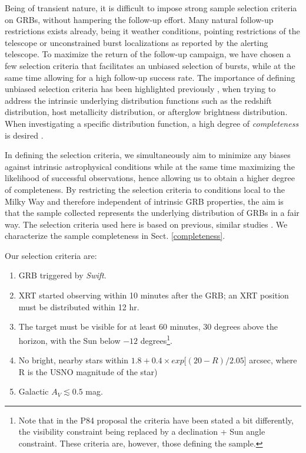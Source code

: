 \documentclass{aa}    %
\begin{document}
Being of transient nature, it is difficult to impose strong sample selection
criteria on GRBs, without hampering the follow-up effort. Many natural follow-up
restrictions exists already, being it weather conditions, pointing restrictions
of the telescope or unconstrained burst localizations as reported by the alerting
telescope. To maximize the return of the follow-up campaign, we have chosen a
few selection criteria that facilitates an unbiased selection of bursts, while
at the same time allowing for a high follow-up success rate. The importance of
defining unbiased selection criteria has been highlighted previously
\citep{Jakobsson2006b, Salvaterra2012, Hjorth2012, Vergani2015, Perley2016a},
when trying to address the intrinsic underlying distribution functions such as
the redshift distribution, host metallicity distribution, or afterglow
brightness distribution. When investigating a specific distribution function, a
high degree of \textit{completeness} is desired \citep[e.g.,][]{Perley2016b}.

In defining the selection criteria, we simultaneously aim to minimize any biases
against intrinsic astrophysical conditions while at the same time maximizing the
likelihood of successful observations, hence allowing us to obtain a higher
degree of completeness. By restricting the selection criteria to conditions
local to the Milky Way and therefore independent of intrinsic GRB properties,
the aim is that the sample collected represents the underlying distribution of
GRBs in a fair way. The selection criteria used here is based on previous,
similar studies \citep{Jakobsson2006b, Fynbo2009, Hjorth2012}. We characterize
the sample completeness in Sect. \ref{completeness}.

Our selection criteria are:

\begin{enumerate}
	\item GRB triggered by \textit{Swift}.
	\item XRT started observing within 10 minutes after the GRB; an XRT position must be distributed within 12 hr.
	\item The target must be visible for at least 60 minutes, 30 degrees above the horizon, with the Sun below $-12$ degrees\footnote{Note that in the P84 proposal the criteria have
	been stated a bit differently, the visibility constraint being replaced by a
	declination + Sun angle constraint. These criteria are, however, those
	defining the sample.}.
	\item No bright, nearby stars within $ 1.8 + 0.4 \times exp[(20 - R)/2.05$] arcsec, where R is the USNO magnitude of the star)
	\item Galactic $A_V \lesssim 0.5$ mag.
\end{enumerate}
\end{document}
